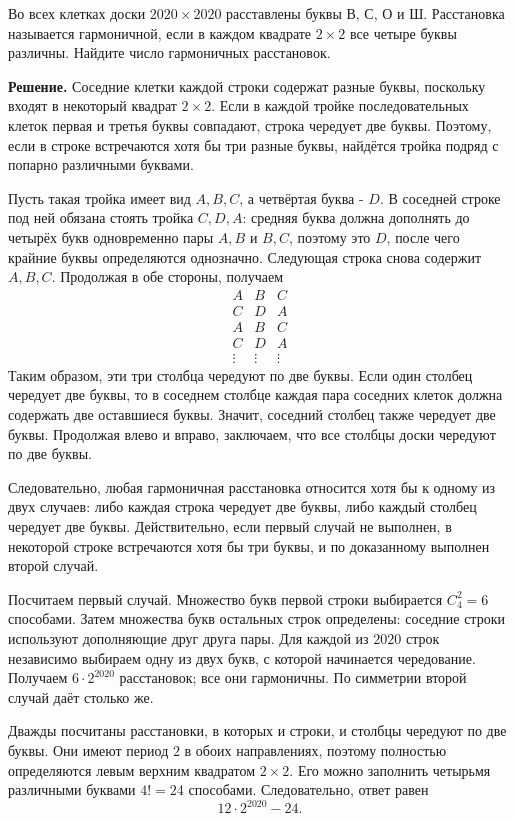 \begin{problems}
\item Во всех клетках доски $2020\times2020$ расставлены буквы В, С, О и Ш. Расстановка называется гармоничной, если в каждом квадрате $2\times2$ все четыре буквы различны. Найдите число гармоничных расстановок.
\par\smallskip\noindent\textbf{Решение.} Соседние клетки каждой строки содержат разные буквы, поскольку входят в некоторый квадрат $2\times2$. Если в каждой тройке последовательных клеток первая и третья буквы совпадают, строка чередует две буквы. Поэтому, если в строке встречаются хотя бы три разные буквы, найдётся тройка подряд с попарно различными буквами.
\par Пусть такая тройка имеет вид $A,B,C$, а четвёртая буква - $D$. В соседней строке под ней обязана стоять тройка $C,D,A$: средняя буква должна дополнять до четырёх букв одновременно пары $A,B$ и $B,C$, поэтому это $D$, после чего крайние буквы определяются однозначно. Следующая строка снова содержит $A,B,C$. Продолжая в обе стороны, получаем
\[
\begin{array}{ccc}
A&B&C\\
C&D&A\\
A&B&C\\
C&D&A\\
\vdots&\vdots&\vdots
\end{array}
\]
Таким образом, эти три столбца чередуют по две буквы. Если один столбец чередует две буквы, то в соседнем столбце каждая пара соседних клеток должна содержать две оставшиеся буквы. Значит, соседний столбец также чередует две буквы. Продолжая влево и вправо, заключаем, что все столбцы доски чередуют по две буквы.
\par Следовательно, любая гармоничная расстановка относится хотя бы к одному из двух случаев: либо каждая строка чередует две буквы, либо каждый столбец чередует две буквы. Действительно, если первый случай не выполнен, в некоторой строке встречаются хотя бы три буквы, и по доказанному выполнен второй случай.
\par Посчитаем первый случай. Множество букв первой строки выбирается $C_4^2=6$ способами. Затем множества букв остальных строк определены: соседние строки используют дополняющие друг друга пары. Для каждой из $2020$ строк независимо выбираем одну из двух букв, с которой начинается чередование. Получаем $6\cdot2^{2020}$ расстановок; все они гармоничны. По симметрии второй случай даёт столько же.
\par Дважды посчитаны расстановки, в которых и строки, и столбцы чередуют по две буквы. Они имеют период $2$ в обоих направлениях, поэтому полностью определяются левым верхним квадратом $2\times2$. Его можно заполнить четырьмя различными буквами $4!=24$ способами. Следовательно, ответ равен
\[
\boxed{12\cdot2^{2020}-24}.
\]\par


\end{problems}
